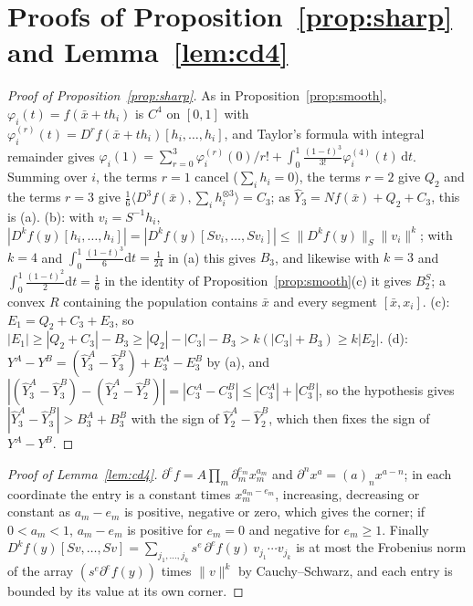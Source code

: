 \documentclass[10pt,a4paper]{article}
\theoremstyle{plain}
\theoremstyle{definition}
\theoremstyle{remark}
\newcommand{\dd}{\mathrm{d}}
\newcommand{\Yh}{\widehat{Y}}
\begin{document}
\section{Proofs of Proposition~\ref{prop:sharp} and Lemma~\ref{lem:cd4}}\label{app:proofs}
\begin{proof}[Proof of Proposition~\ref{prop:sharp}]
As in Proposition~\ref{prop:smooth}, $\varphi_i(t)=f(\bar x+th_i)$ is $C^4$ on $[0,1]$ with $\varphi_i^{(r)}(t)=D^r\!f(\bar x+th_i)[h_i,\dots,h_i]$, and Taylor's formula with integral remainder gives $\varphi_i(1)=\sum_{r=0}^3\varphi_i^{(r)}(0)/r!+\int_0^1\frac{(1-t)^3}{3!}\varphi_i^{(4)}(t)\,\dd t$. Summing over $i$, the terms $r=1$ cancel ($\sum_ih_i=0$), the terms $r=2$ give $Q_2$ and the terms $r=3$ give $\frac16\langle D^3\!f(\bar x),\sum_ih_i^{\otimes3}\rangle=C_3$; as $\Yh_3=Nf(\bar x)+Q_2+C_3$, this is (a). (b): with $v_i=S^{-1}h_i$, $|D^k\!f(y)[h_i,\dots,h_i]|=|D^k\!f(y)[Sv_i,\dots,Sv_i]|\le\|D^k\!f(y)\|_S\|v_i\|^k$; with $k=4$ and $\int_0^1\frac{(1-t)^3}{6}\dd t=\frac1{24}$ in (a) this gives $B_3$, and likewise with $k=3$ and $\int_0^1\frac{(1-t)^2}{2}\dd t=\frac16$ in the identity of Proposition~\ref{prop:smooth}(c) it gives $B_2^S$; a convex $R$ containing the population contains $\bar x$ and every segment $[\bar x,x_i]$. (c): $E_1=Q_2+C_3+E_3$, so $|E_1|\ge|Q_2+C_3|-B_3\ge|Q_2|-|C_3|-B_3>k(|C_3|+B_3)\ge k|E_2|$. (d): $Y^A-Y^B=(\Yh_3^A-\Yh_3^B)+E_3^A-E_3^B$ by (a), and $|(\Yh_3^A-\Yh_3^B)-(\Yh_2^A-\Yh_2^B)|=|C_3^A-C_3^B|\le|C_3^A|+|C_3^B|$, so the hypothesis gives $|\Yh_3^A-\Yh_3^B|>B_3^A+B_3^B$ with the sign of $\Yh_2^A-\Yh_2^B$, which then fixes the sign of $Y^A-Y^B$.
\end{proof}
\begin{proof}[Proof of Lemma~\ref{lem:cd4}]
$\partial^e\!f=A\prod_m\partial_m^{e_m}x_m^{a_m}$ and $\partial^nx^a=(a)_nx^{a-n}$; in each coordinate the entry is a constant times $x_m^{a_m-e_m}$, increasing, decreasing or constant as $a_m-e_m$ is positive, negative or zero, which gives the corner; if $0<a_m<1$, $a_m-e_m$ is positive for $e_m=0$ and negative for $e_m\ge1$. Finally $D^k\!f(y)[Sv,\dots,Sv]=\sum_{j_1,\dots,j_k}s^e\,\partial^e\!f(y)\,v_{j_1}\cdots v_{j_k}$ is at most the Frobenius norm of the array $(s^e\partial^e\!f(y))$ times $\|v\|^k$ by Cauchy--Schwarz, and each entry is bounded by its value at its own corner.
\end{proof}
\end{document}
